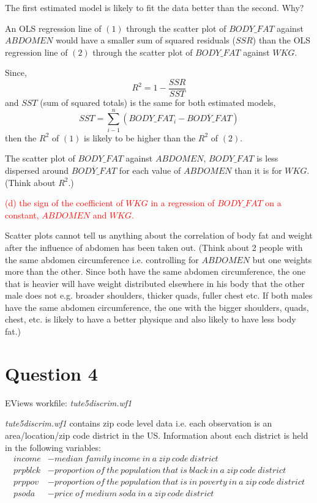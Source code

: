 \documentclass[12pt]{report}
\begin{document}
\noindent The first estimated model is likely to fit the data better than the second. Why?

\noindent An OLS regression line of $(1)$ through the scatter plot of $BODY\_FAT$ against $ABDOMEN$ would have a smaller sum of squared residuals ($SSR$) than the OLS regression line of  $(2)$ through the scatter plot of $BODY\_FAT$ against $WKG$.

\noindent Since, $$R^2 = 1 - \dfrac{SSR}{SST}$$ and $SST$ (sum of squared totals) is the same for both estimated models, $$SST = \sum_{i-1}^{n}(BODY\_FAT_i - \overline{BODY\_FAT})$$ then the $R^2$ of $(1)$ is likely to be higher than the $R^2$ of $(2)$.

\noindent The scatter plot of $BODY\_FAT$ against $ABDOMEN$, $BODY\_FAT$ is less dispersed around $\overline{BODY\_FAT}$ for each value of $ABDOMEN$ than it is for $WKG$. (Think about $R^2$.)

\noindent \textcolor{red}{(d) the sign of the coefficient of $WKG$ in a regression of $BODY\_FAT$ on a constant, $ABDOMEN$ and $WKG$.} 

\noindent Scatter plots cannot tell us anything about the correlation of body fat and weight after the influence of abdomen has been taken out. (Think about 2 people with the same abdomen circumference i.e. controlling for $ABDOMEN$ but one weights more than the other. Since both have the same abdomen circumference, the one that is heavier will have weight distributed elsewhere in his body that the other male does not e.g. broader shoulders, thicker quads, fuller chest etc. If both males have the same abdomen circumference, the one with the bigger shoulders, quads, chest, etc. is likely to have a better physique and also likely to have less body fat.)

\newpage
\section*{Question 4}
\noindent EViews workfile: \textit{tute5discrim.wf1}

\noindent \textit{tute5discrim.wf1} contains zip code level data i.e. each observation is an area/location/zip code district in the US. Information about each district is held in the following variables:
\begin{align*}
income &- median\ family\ income\ in\ a\ zip\ code\ district \\
prpblck &- proportion\ of\ the\ population\ that\ is\ black\ in\ a\ zip\ code\ district \\
prppov &- proportion\ of\ the\ population\ that\ is\ in\ poverty\ in\ a\ zip\ code\ district \\
psoda &- price\ of\ medium\ soda\ in\ a\ zip\ code\ district
\end{align*}
\end{document}
